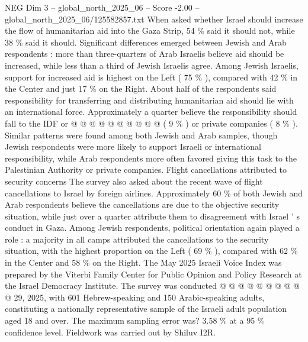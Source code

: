 \begin{textsample}{NEG Dim 3 – global\_north\_2025\_06 – Score -2.00 – global\_north\_2025\_06/125582857.txt}
When asked whether Israel should increase the flow of humanitarian aid into the Gaza Strip, 54 \% said it should not, while 38 \% said it should.
Significant differences emerged between Jewish and Arab respondents : more than three-quarters of Arab Israelis believe aid should be increased, while less than a third of Jewish Israelis agree.
Among Jewish Israelis, support for increased aid is highest on the Left ( 75 \% ), compared with 42 \% in the Center and just 17 \% on the Right.
About half of the respondents said responsibility for transferring and distributing humanitarian aid should lie with an international force.
Approximately a quarter believe the responsibility should fall to the IDF or @ @ @ @ @ @ @ @ @ @ ( 9 \% ) or private companies ( 8 \% ).
Similar patterns were found among both Jewish and Arab samples, though Jewish respondents were more likely to support Israeli or international responsibility, while Arab respondents more often favored giving this task to the Palestinian Authority or private companies.
Flight cancellations attributed to security concerns The survey also asked about the recent wave of flight cancellations to Israel by foreign airlines.
Approximately 60 \% of both Jewish and Arab respondents believe the cancellations are due to the objective security situation, while just over a quarter attribute them to disagreement with Israel ' s conduct in Gaza.
Among Jewish respondents, political orientation again played a role : a majority in all camps attributed the cancellations to the security situation, with the highest proportion on the Left ( 69 \% ), compared with 62 \% in the Center and 58 \% on the Right.
The May 2025 Israeli Voice Index was prepared by the Viterbi Family Center for Public Opinion and Policy Research at the Israel Democracy Institute.
The survey was conducted @ @ @ @ @ @ @ @ @ @ 29, 2025, with 601 Hebrew-speaking and 150 Arabic-speaking adults, constituting a nationally representative sample of the Israeli adult population aged 18 and over.
The maximum sampling error was? 3.58 \% at a 95 \% confidence level.
Fieldwork was carried out by Shiluv I2R.

\end{textsample}
